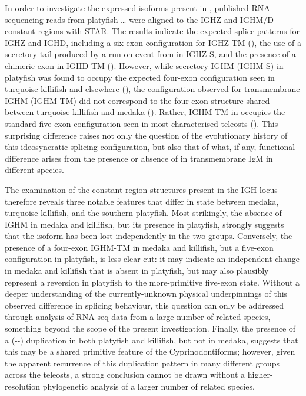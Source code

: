 	In order to investigate the expressed isoforms present in \Xma, published RNA-sequencing reads from platyfish \dots %
	were aligned to the IGHZ and IGHM/D constant regions with STAR. %
	The results indicate the expected splice patterns for IGHZ and IGHD, including a six-exon configuration for IGHZ-TM (), the use of a  secretory tail produced by a run-on event from  in IGHZ-S, and the presence of a chimeric  exon in IGHD-TM (). However, while secretory IGHM (IGHM-S) in platyfish was found to occupy the expected four-exon configuration seen in turquoise killifish and elsewhere (), the configuration observed for transmembrane IGHM (IGHM-TM) did not correspond to the four-exon structure shared between turquoise killifish and medaka (). Rather, IGHM-TM in \Xma occupies the standard five-exon configuration seen in most characterised teleosts (). This surprising difference raises not only the question of the evolutionary history of this ideosyncratic splicing configuration, but also that of what, if any, functional difference arises from the presence or absence of  in transmembrane IgM in different species. %

	The examination of the constant-region structures present in the \Xma IGH locus therefore reveals three notable features that differ in state between medaka, turquoise killifish, and the southern platyfish. Most strikingly, the absence of IGHM in medaka and killifish, but its presence in platyfish, strongly suggests that the isoform has been lost independently in the two groups. Conversely, the presence of a four-exon IGHM-TM in medaka and killifish, but a five-exon configuration in platyfish, is less clear-cut: it may indicate an independent change in medaka and killifish that is absent in platyfish, but may also plausibly represent a reversion in platyfish to the more-primitive five-exon state. Without a deeper understanding of the currently-unknown physical underpinnings of this observed difference in splicing behaviour, this question can only be addressed through analysis of RNA-seq data from a large number of related species, something beyond the scope of the present investigation. %
	Finally, the presence of a (--) duplication in both platyfish and killifish, but not in medaka, suggests that this may be a shared primitive feature of the Cyprinodontiforms; however, given the apparent recurrence of this duplication pattern in many different groups across the teleosts, a strong conclusion cannot be drawn without a higher-resolution phylogenetic analysis of a larger number of related species. %
	
